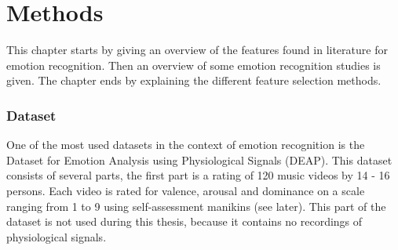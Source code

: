 \chapter{Methods}
{\samenvatting This chapter starts by giving an overview of the features found in literature for emotion recognition. Then an overview of some emotion recognition studies is given. The chapter ends by explaining the different feature selection methods.} %

\subsection{Dataset}
One of the most used datasets in the context of emotion recognition is the Dataset for Emotion Analysis using Physiological Signals (DEAP)\cite{DEAP}. This dataset consists of several parts, the first part is a rating of 120 music videos by 14 - 16 persons. Each video is rated for valence, arousal and dominance on a scale ranging from 1 to 9 using self-assessment manikins (see later). This part of the dataset is not used during this thesis, because it contains no recordings of physiological signals.

\npar

